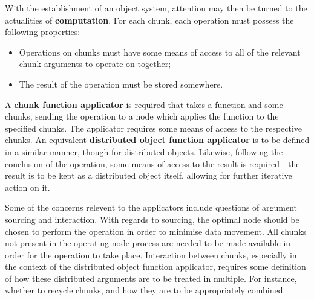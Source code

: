 \documentclass[letterpaper, inpress]{jds} %
\begin{document}
With the establishment of an object system, attention may then be turned to the actualities of \textbf{computation}. 
For each chunk, each operation must possess the following properties:

\begin{itemize}
    \item Operations on chunks must have some means of access to all of the relevant chunk arguments to operate on together;
    \item The result of the operation must be stored somewhere.
\end{itemize}

A \textbf{chunk function applicator} is required that takes a function and some chunks, sending the operation to a node which applies the function to the specified chunks.
The applicator requires some means of access to the respective chunks.
An equivalent \textbf{distributed object function applicator} is to be defined in a similar manner, though for distributed objects.
Likewise, following the conclusion of the operation, some means of access to the result is required - the result is to be kept as a distributed object itself, allowing for further iterative action on it.

Some of the concerns relevent to the applicators include questions of argument sourcing and interaction.
With regards to sourcing, the optimal node should be chosen to perform the operation in order to minimise data movement.
All chunks not present in the operating node process are needed to be made available in order for the operation to take place.
Interaction between chunks, especially in the context of the distributed object function applicator, requires some definition of how these distributed arguments are to be treated in multiple.
For instance, whether to recycle chunks, and how they are to be appropriately combined.
\end{document}
